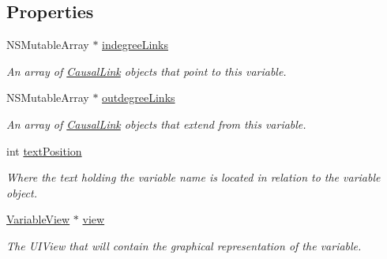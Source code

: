 \subsection*{Properties}
\begin{DoxyCompactItemize}
\item 
\hypertarget{interface_variable_acccd26f3cbfd25fc87ff63a9e5ebd6cf}{N\-S\-Mutable\-Array $\ast$ \hyperlink{interface_variable_acccd26f3cbfd25fc87ff63a9e5ebd6cf}{indegree\-Links}}\label{interface_variable_acccd26f3cbfd25fc87ff63a9e5ebd6cf}

\begin{DoxyCompactList}\small\item\em An array of \hyperlink{interface_causal_link}{Causal\-Link} objects that point to this variable. \end{DoxyCompactList}\item 
\hypertarget{interface_variable_aafe54a40e314c1bb23ea7d5cb5456586}{N\-S\-Mutable\-Array $\ast$ \hyperlink{interface_variable_aafe54a40e314c1bb23ea7d5cb5456586}{outdegree\-Links}}\label{interface_variable_aafe54a40e314c1bb23ea7d5cb5456586}

\begin{DoxyCompactList}\small\item\em An array of \hyperlink{interface_causal_link}{Causal\-Link} objects that extend from this variable. \end{DoxyCompactList}\item 
\hypertarget{interface_variable_a0e3597199260a059ec632e5d54adb06e}{int \hyperlink{interface_variable_a0e3597199260a059ec632e5d54adb06e}{text\-Position}}\label{interface_variable_a0e3597199260a059ec632e5d54adb06e}

\begin{DoxyCompactList}\small\item\em Where the text holding the variable name is located in relation to the variable object. \end{DoxyCompactList}\item 
\hypertarget{interface_variable_a7e8a4af98b5a08b166ccd5d637cb380a}{\hyperlink{interface_variable_view}{Variable\-View} $\ast$ \hyperlink{interface_variable_a7e8a4af98b5a08b166ccd5d637cb380a}{view}}\label{interface_variable_a7e8a4af98b5a08b166ccd5d637cb380a}

\begin{DoxyCompactList}\small\item\em The U\-I\-View that will contain the graphical representation of the variable. \end{DoxyCompactList}\end{DoxyCompactItemize}
